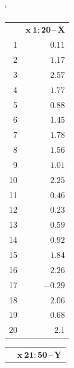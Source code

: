 \documentclass[pdftex, 11pt, a4paper, titlepage]{article}
\begin{document}
    \noindent
    \begin{table}[H]
        \catcode`
		\begin{tabular}[t]{r|r|}
			\multicolumn{1}{c}{} & \multicolumn{1}{c}{$ \boldsymbol{x\ 1:20}
			$\,--\,$\boldsymbol{X} $} \\ \cline{2-2}

			1 & $ 0.11 $ \\ \cline{2-2}
			2 & $ 1.17 $ \\ \cline{2-2}
			3 & $ 2.57 $ \\ \cline{2-2}
			4 & $ 1.77 $ \\ \cline{2-2}
			5 & $ 0.88 $ \\ \cline{2-2}
			6 & $ 1.45 $ \\ \cline{2-2}
			7 & $ 1.78 $ \\ \cline{2-2}
			8 & $ 1.56 $ \\ \cline{2-2}
			9 & $ 1.01 $ \\ \cline{2-2}
			10 & $ 2.25 $ \\ \cline{2-2}
			11 & $ 0.46 $ \\ \cline{2-2}
			12 & $ 0.23 $ \\ \cline{2-2}
			13 & $ 0.59 $ \\ \cline{2-2}
			14 & $ 0.92 $ \\ \cline{2-2}
			15 & $ 1.84 $ \\ \cline{2-2}
			16 & $ 2.26 $ \\ \cline{2-2}
			17 & $ -0.29 $ \\ \cline{2-2}
			18 & $ 2.06 $ \\ \cline{2-2}
			19 & $ 0.68 $\\ \cline{2-2}
			20 & $ 2.1 $ \\ \cline{2-2}
		\end{tabular}
%
		\hspace{4em}
%
		\begin{tabular}[t]{r|r|}
			\multicolumn{1}{c}{} & \multicolumn{1}{c}{$ \boldsymbol{x\ 21:50}
			$\,--\,$ \boldsymbol{Y} $} \\ \cline{2-2}


\end{tabular}
\end{table}
\end{document}
